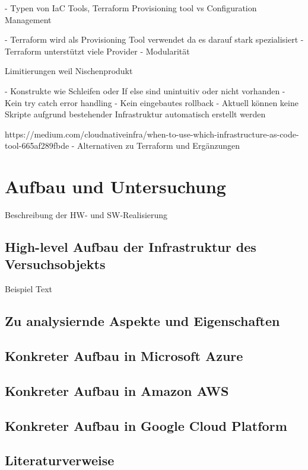 - Typen von IaC Tools, Terraform Provisioning tool vs Configuration Management

- Terraform wird als Provisioning Tool verwendet da es darauf stark spezialisiert
- Terraform unterstützt viele Provider
- Modularität

Limitierungen weil Nischenprodukt

- Konstrukte wie Schleifen oder If else sind unintuitiv oder nicht vorhanden
- Kein try catch error handling
- Kein eingebautes rollback
- Aktuell können keine Skripte aufgrund bestehender Infrastruktur automatisch
erstellt werden

https://medium.com/cloudnativeinfra/when-to-use-which-infrastructure-as-code-tool-665af289fbde
- Alternativen zu Terraform und Ergänzungen

\chapter{Aufbau und Untersuchung}
\label{sec:real}
Beschreibung der HW- und SW-Realisierung

\section{High-level Aufbau der Infrastruktur des Versuchsobjekts}
\label{sec:real-unter}
Beispiel Text

\section{Zu analysiernde Aspekte und Eigenschaften}

\section{Konkreter Aufbau in Microsoft Azure}

\section{Konkreter Aufbau in Amazon AWS}

\section{Konkreter Aufbau in Google Cloud Platform}

\section{Literaturverweise}
\label{sec:real-literatur}


